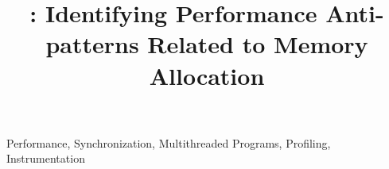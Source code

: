 \documentclass[preprint,10pt]{sigplanconf}
\begin{document}
\setlength{\pdfpageheight}{\paperheight}
\setlength{\pdfpagewidth}{\paperwidth}


\title{{\huge \bf \HeapPerf{}}: Identifying Performance Anti-patterns Related to Memory Allocation}%







\maketitle

\begin{abstract}

\end{abstract}


\keywords
Performance, Synchronization, Multithreaded Programs, Profiling, Instrumentation



\end{document}
